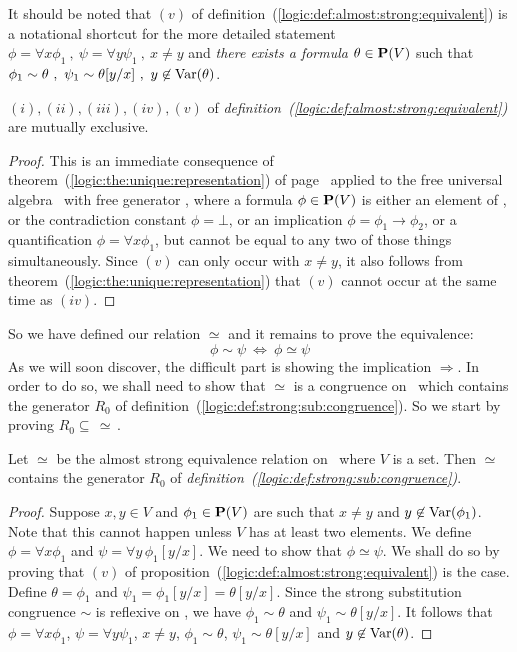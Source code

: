 It should be noted that $(v)$ of
definition~(\ref{logic:def:almost:strong:equivalent}) is a
notational shortcut for the more detailed statement $\phi=\forall
x\phi_{1}\ ,\ \psi=\forall y\psi_{1}\ ,\ x\neq y$ and {\em there
exists a formula} $\theta\in\mbox{${\bf P}(V)$}$ such that $\phi_{1}\sim \theta\ ,\
\psi_{1}\sim \theta[y/x]\ ,\ y\not\in\mbox{\rm Var}(\theta)$.

\begin{prop}
$(i),(ii),(iii),(iv), (v)$ of {\em
definition~(\ref{logic:def:almost:strong:equivalent})} are mutually
exclusive.
\end{prop}
\begin{proof}
This is an immediate consequence of
theorem~(\ref{logic:the:unique:representation}) of
page~\pageref{logic:the:unique:representation} applied to the free
universal algebra \pv\ with free generator \pvo, where a formula
$\phi\in\mbox{${\bf P}(V)$}$ is either an element of \pvo, or the contradiction
constant $\phi=\bot$, or an implication $\phi=\phi_{1}\to\phi_{2}$,
or a quantification $\phi=\forall x\phi_{1}$, but cannot be equal to
any two of those things simultaneously. Since $(v)$ can only occur
with $x\neq y$, it also follows from
theorem~(\ref{logic:the:unique:representation}) that $(v)$ cannot
occur at the same time as $(iv)$.
\end{proof}

So we have defined our relation $\simeq$ and it remains to prove the
equivalence:
    \[
    \phi\sim\psi\ \Leftrightarrow\ \phi\simeq\psi
    \]
As we will soon discover, the difficult part is showing the
implication $\Rightarrow$. In order to do so, we shall need to show
that $\simeq$ is a congruence on \pv\ which contains the generator
$R_{0}$ of definition~(\ref{logic:def:strong:sub:congruence}). So we
start by proving $R_{0}\subseteq\,\simeq$\,.

\begin{prop}\label{logic:prop:almost:strong:contains:r0}
Let $\simeq$ be the almost strong equivalence relation on \pv\ where
$V$ is a set. Then $\simeq$ contains the generator $R_{0}$ of {\em
definition~(\ref{logic:def:strong:sub:congruence})}.
\end{prop}
\begin{proof}
Suppose $x,y\in V$ and $\phi_{1}\in\mbox{${\bf P}(V)$}$ are such that $x\neq y$ and
$y\not\in\mbox{\rm Var}(\phi_{1})$. Note that this cannot happen unless $V$
has at least two elements. We define $\phi=\forall x\phi_{1}$ and
$\psi=\forall y\,\phi_{1}[y/x]$. We need to show that
$\phi\simeq\psi$. We shall do so by proving that $(v)$ of
proposition~(\ref{logic:def:almost:strong:equivalent}) is the case.
Define  $\theta=\phi_{1}$ and $\psi_{1}=\phi_{1}[y/x]=\theta[y/x]$.
Since the strong substitution congruence $\sim$ is reflexive on \pv,
we have $\phi_{1}\sim\theta$ and $\psi_{1}\sim\theta[y/x]$. It
follows that $\phi=\forall x\phi_{1}$, $\psi=\forall y\psi_{1}$,
$x\neq y$, $\phi_{1}\sim\theta$, $\psi_{1}\sim\theta[y/x]$ and
$y\not\in\mbox{\rm Var}(\theta)$.
\end{proof}

